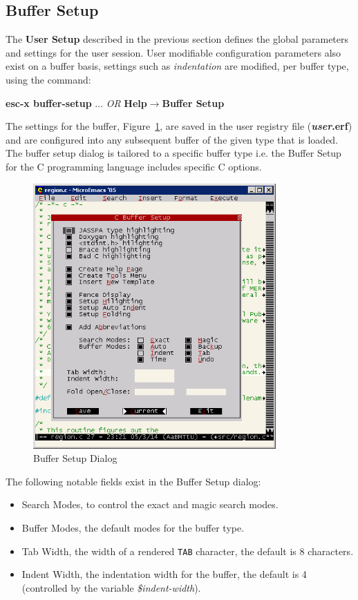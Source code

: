 \documentclass[11pt,a4paper,pdftex]{article}
\begin{document}
\subsection{Buffer Setup}

  The \textbf{User Setup} described in the previous section defines the global
  parameters and settings for the user session. User modifiable configuration
  parameters also exist on a buffer basis, settings such as
  \textit{indentation} are modified, per buffer type, using the command:
  
  \textbf{esc-x buffer-setup} $\dots$ \textit{OR}\newline
  \textbf{Help$\rightarrow$Buffer Setup}
  
  The settings for the buffer, Figure~\ref{fig:buffersetup}, are saved in the
  user registry file (\textbf{\textit{user}.erf}) and are configured into any
  subsequent buffer of the given type that is loaded. The buffer setup dialog
  is tailored to a specific buffer type i.e. the Buffer Setup for the C
  programming language includes specific C options. 
  
\begin{figure}[!hbt]
  \begin{center}
    \includegraphics[keepaspectratio,height=4in]{buffersetup}
    \caption{Buffer Setup Dialog}
    \label{fig:buffersetup}
  \end{center}
\end{figure}
  
  The following notable fields exist in the Buffer Setup dialog:
  
  \begin{itemize}
    \item Search Modes, to control the exact and magic search modes.
    \item Buffer Modes, the default modes for the buffer type.
    \item Tab Width, the width of a rendered \texttt{TAB} character, the 
    default is 8 characters.
    \item Indent Width, the indentation width for the buffer, the default is 4 
    (controlled by the variable \textit{\$indent-width}).
  \end{itemize}
  
\end{document}
